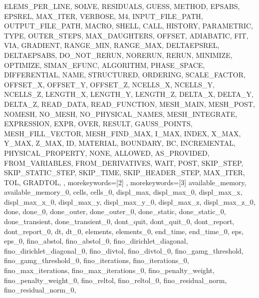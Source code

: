 {{      ELEMS_PER_LINE,
      SOLVE,
      RESIDUALS,
      GUESS,
      METHOD,
      EPSABS,
      EPSREL,
      MAX_ITER,
      VERBOSE,
      M4,
      INPUT_FILE_PATH,
      OUTPUT_FILE_PATH,
      MACRO,
      SHELL,
      CALL,
      HISTORY,
      PARAMETRIC,
      TYPE,
      OUTER_STEPS,
      MAX_DAUGHTERS,
      OFFSET,
      ADIABATIC,
      FIT,
      VIA,
      GRADIENT,
      RANGE_MIN,
      RANGE_MAX,
      DELTAEPSREL,
      DELTAEPSABS,
      DO_NOT_RERUN,
      NORERUN,
      RERUN,
      MINIMIZE,
      OPTIMIZE,
      SIMAN_EFUNC,
      ALGORITHM,
      PHASE_SPACE,
      DIFFERENTIAL,
      NAME,
      STRUCTURED,
      ORDERING,
      SCALE_FACTOR,
      OFFSET_X,
      OFFSET_Y,
      OFFSET_Z,
      NCELLS_X,
      NCELLS_Y,
      NCELLS_Z,
      LENGTH_X,
      LENGTH_Y,
      LENGTH_Z,
      DELTA_X,
      DELTA_Y,
      DELTA_Z,
      READ_DATA,
      READ_FUNCTION,
      MESH_MAIN,
      MESH_POST,
      NOMESH,
      NO_MESH,
      NO_PHYSICAL_NAMES,
      MESH_INTEGRATE,
      EXPRESSION,
      EXPR,
      OVER,
      RESULT,
      GAUSS_POINTS,
      MESH_FILL_VECTOR,
      MESH_FIND_MAX,
      I_MAX,
      INDEX,
      X_MAX,
      Y_MAX,
      Z_MAX,
      ID,
      MATERIAL,
      BOUNDARY,
      BC,
      INCREMENTAL,
      PHYSICAL_PROPERTY,
      NONE,
      ALLOWED,
      AS_PROVIDED,
      FROM_VARIABLES,
      FROM_DERIVATIVES,
      WAIT,
      POST,
      SKIP_STEP,
      SKIP_STATIC_STEP,
      SKIP_TIME,
      SKIP_HEADER_STEP,
      MAX_ITER,
      TOL,
      GRADTOL,
},
morekeywords={[2]
},
morekeywords={[3]
      available_memory,
      available_memory_0,
      cells,
      cells_0,
      displ_max,
      displ_max_0,
      displ_max_x,
      displ_max_x_0,
      displ_max_y,
      displ_max_y_0,
      displ_max_z,
      displ_max_z_0,
      done,
      done_0,
      done_outer,
      done_outer_0,
      done_static,
      done_static_0,
      done_transient,
      done_transient_0,
      dont_quit,
      dont_quit_0,
      dont_report,
      dont_report_0,
      dt,
      dt_0,
      elements,
      elements_0,
      end_time,
      end_time_0,
      eps,
      eps_0,
      fino_abstol,
      fino_abstol_0,
      fino_dirichlet_diagonal,
      fino_dirichlet_diagonal_0,
      fino_divtol,
      fino_divtol_0,
      fino_gamg_threshold,
      fino_gamg_threshold_0,
      fino_iterations,
      fino_iterations_0,
      fino_max_iterations,
      fino_max_iterations_0,
      fino_penalty_weight,
      fino_penalty_weight_0,
      fino_reltol,
      fino_reltol_0,
      fino_residual_norm,
      fino_residual_norm_0,
}}
